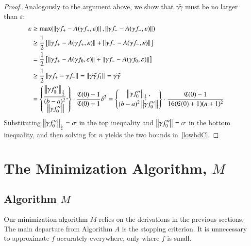 \documentclass[review]{elsarticle}
\newcommand{\abstol}{\varepsilon}
\theoremstyle{definition}
\newcommand{\tgamma}{\widetilde{\gamma}}
\begin{document}
\begin{proof}
Analogously to the argument above, we show that $\gamma\tgamma$ must be no larger 
than	$\abstol$:
	\begin{align*}
	\abstol & \ge \max(\norm{\gamma f_+-A(\gamma f_+,\abstol)},
	\norm{\gamma f_--A(\gamma f_-, \abstol)}) \\
	& \ge \frac{1}{2} \left[ \norm{\gamma f_+-A(\gamma f_+,\abstol)}
	+ \norm{\gamma f_--A(\gamma f_-, \abstol)} \right] \\
	& = \frac{1}{2} \left[ \norm{\gamma f_+-A(\gamma f_0,\abstol)}
	+ \norm{\gamma f_--A(\gamma f_0, \abstol)} \right] \\
	& \ge \frac{1}{2}  \norm{\gamma f_+ - \gamma f_-} =  \norm{\gamma \tgamma f_1}
	= \gamma \tgamma\\
	& = \begin{Bmatrix} \displaystyle
	\frac{\norm[\frac 12]{\gamma f_0''}}{(b-a)^2}, \\
	\norm{\gamma f_0''}
	\end{Bmatrix}  \cdot \frac{\fC(0)-1}{\fC(0)+1} \delta^2
	 = \begin{Bmatrix} \displaystyle
	\norm[\frac 12]{\gamma f_0''}, \\
	(b-a)^2\norm{\gamma f_0''}
	\end{Bmatrix}  \cdot \frac{\fC(0)-1}{16(\fC(0)+1)(n+1)^2}
	\end{align*}
	Substituting $\norm[\frac12]{\gamma f_0''} = \sigma$ in the top inequality and
	$\norm{\gamma f_0''} = \sigma$ in the bottom inequality, and then solving for
	$n$ yields the two bounds in~\eqref{lowbdC}.
\end{proof}


\section{The Minimization Algorithm, $M$} \label{sec:funmin}

\subsection{Algorithm $M$}  \label{sec:minalgo}

Our minimization algorithm $M$ relies on the derivations in the previous
sections. The main departure from Algorithm $A$ is the stopping criterion. It is
unnecessary to approximate $f$ accurately everywhere,  only where $f$ is small.
\end{document}
